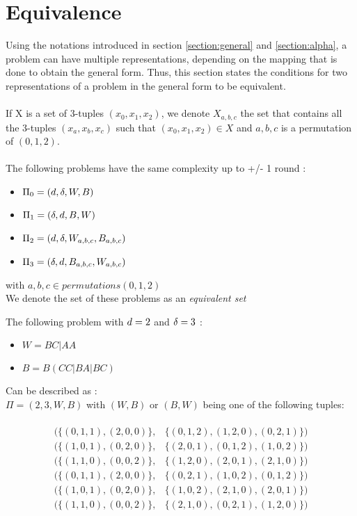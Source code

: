 \section{Equivalence}
Using the notations introduced in section \ref{section:general} and \ref{section:alpha}, a problem can have multiple representations, depending on the mapping that is done to obtain the general form. Thus, this section states the conditions for two representations of a problem in the general form to be equivalent.\\\\
If X is a set of 3-tuples $(x_0,x_1, x_2)$, we denote $X_{a,b,c}$ the set that contains all the 3-tuples $(x_a,x_b, x_c)$ such that $(x_0,x_1, x_2)\in X$ and $a,b,c$ is a permutation of $(0,1,2) $.\\\\
The following problems have the same complexity up to +/- 1 round : 
\begin{itemize}
    \item $\Pi_0 = (d,\delta,W,B)$
    \item $\Pi_1 = (\delta,d,B,W)$
    \item $\Pi_2 = (d,\delta,W_{a,b,c},B_{a,b,c})$
    \item $\Pi_3 = (\delta,d,B_{a,b,c},W_{a,b,c})$
\end{itemize}
with $a,b,c \in permutations(0,1,2)$\\
We denote the set of these problems as an \textit{equivalent set}
\begin{exmp}\label{exp_def_1}
The following problem with $d = 2$ and $\delta = 3$ :
\begin{itemize}
    \item $W = BC|AA$
    \item $B = B(CC|BA|BC)$
\end{itemize}
Can be described as :\\
$\Pi = (2,3,W,B)$ with $(W,B)$ or $(B,W)$ being one of the following tuples:\\\\
$$\begin{array}{cc}
    ( \{(0,1,1),(2, 0, 0)\}, &  \{(0,1,2),(1,2,0),(0,2,1)\} )\\
    ( \{(1,0,1),(0, 2, 0)\}, &  \{(2,0,1),(0,1,2),(1,0,2)\} )\\
    ( \{(1,1,0),(0, 0, 2)\}, &  \{(1,2,0),(2,0,1),(2,1,0)\} )\\
    ( \{(0,1,1),(2, 0, 0)\}, &  \{(0,2,1),(1,0,2),(0,1,2)\} )\\
    ( \{(1,0,1),(0, 2, 0)\}, &  \{(1,0,2),(2,1,0),(2,0,1)\} )\\
    ( \{(1,1,0),(0, 0, 2)\}, &  \{(2,1,0),(0,2,1),(1,2,0)\} )
\end{array}$$
\end{exmp}

